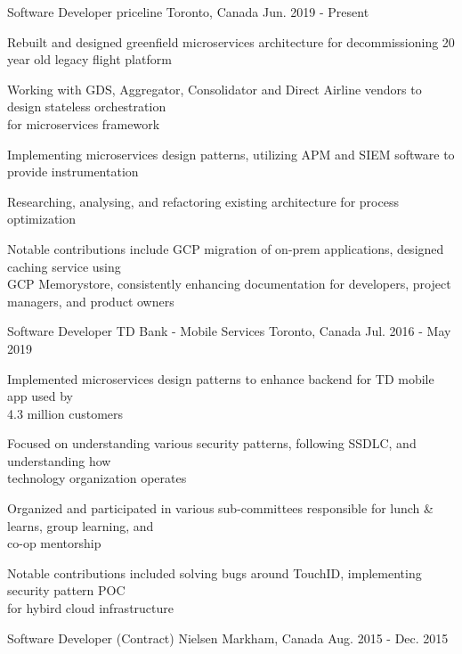 \begin{cventries}
  \cventry
    {Software Developer}
    {priceline}
    {Toronto, Canada}
    {Jun. 2019 - Present}
    {
      \begin{cvitems}
        \item {Rebuilt and designed greenfield microservices architecture for decommissioning 20 year old legacy flight platform}
        \item {Working with GDS, Aggregator, Consolidator and Direct Airline vendors to design stateless orchestration \\for microservices framework}
        \item {Implementing microservices design patterns, utilizing APM and SIEM software to provide instrumentation}
        \item {Researching, analysing, and refactoring existing architecture  for process optimization}
        \item {Notable contributions include GCP migration of on-prem applications, designed caching service using \\GCP Memorystore, consistently enhancing documentation for developers, project managers, and product owners}
      \end{cvitems}
    }
  \cventry
    {Software Developer}
    {TD Bank - Mobile Services}
    {Toronto, Canada}
    {Jul. 2016 - May 2019}
    {
      \begin{cvitems}
        \item {Implemented microservices design patterns to enhance backend for TD mobile app used by \\4.3 million customers}
        \item {Focused on understanding various security patterns, following SSDLC, and understanding how \\technology organization operates}
        \item {Organized and participated in various sub-committees responsible for lunch \& learns, group learning, and \\co-op mentorship}
        \item {Notable contributions included solving bugs around TouchID, implementing security pattern POC \\for hybird cloud infrastructure}
      \end{cvitems}
    }
  \cventry
    {Software Developer (Contract)}
    {Nielsen}
    {Markham, Canada}
    {Aug. 2015 - Dec. 2015}
    {
      \begin{cvitems}

\end{cvitems}}
\end{cventries}
